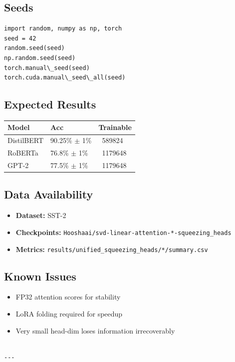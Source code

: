 \subsection{Seeds}

\begin{lstlisting}
import random, numpy as np, torch
seed = 42
random.seed(seed)
np.random.seed(seed)
torch.manual\_seed(seed)
torch.cuda.manual\_seed\_all(seed)
\end{lstlisting}

\subsection{Expected Results}

\begin{table}[H]
\centering
\small
\begin{tabular}{lll}
\toprule
\textbf{Model} & \textbf{Acc} & \textbf{Trainable} \\
\midrule
DistilBERT & 90.25\% $\pm$ 1\% & ~589824 \\
RoBERTa & 76.8\% $\pm$ 1\% & ~1179648 \\
GPT-2 & 77.5\% $\pm$ 1\% & ~1179648 \\
\bottomrule
\end{tabular}
\end{table}

\subsection{Data Availability}

\begin{itemize}
\item \textbf{Dataset:} SST-2
\item \textbf{Checkpoints:} \texttt{Hooshaai/svd-linear-attention-*-squeezing\_heads}
\item \textbf{Metrics:} \texttt{results/unified\_squeezing\_heads/*/summary.csv}

\end{itemize}
\subsection{Known Issues}

\begin{itemize}
\item FP32 attention scores for stability
\item LoRA folding required for speedup
\item Very small head-dim loses information irrecoverably
\end{itemize}
\begin{lstlisting}

---
\end{lstlisting}